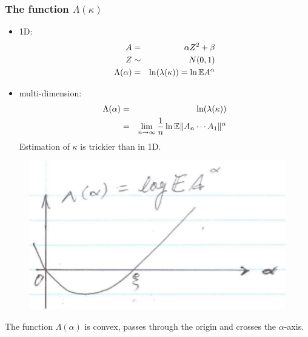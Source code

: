 \documentclass{beamer}
\begin{document}
\begin{frame}
  \frametitle{The function $\Lambda(\kappa)$}
  \begin{minipage}{0.5\linewidth}
      \begin{itemize}
      \item 1D:
        \begin{eqnarray*}
          A &=& \alpha Z^2 + \beta \\
          Z &\sim& N(0,1) \\
          \Lambda(\alpha) &=& \ln(\lambda(\kappa)) = \ln \mathbb{E} A^\alpha          
        \end{eqnarray*}
      \item multi-dimension:
        \begin{eqnarray*}
          \Lambda(\alpha) &=& \ln(\lambda(\kappa)) \\
          &=& \lim_{n \to \infty} {1 \over n} \ln \mathbb{E} \|A_n \cdots A_1\|^\alpha
        \end{eqnarray*}
        Estimation of $\kappa$ is trickier than in 1D.
      \end{itemize}
  \end{minipage}\hfill
  \begin{minipage}{0.4\linewidth}
    \begin{figure}
      \centering
      \includegraphics[width=1.0\linewidth]{pic2.pdf}
    \end{figure}
    \begin{scriptsize}
    The function $\Lambda(\alpha)$ is convex, passes through the origin
    and crosses the $\alpha$-axis.
    \end{scriptsize}
  \end{minipage}
\end{frame}
\end{document}
